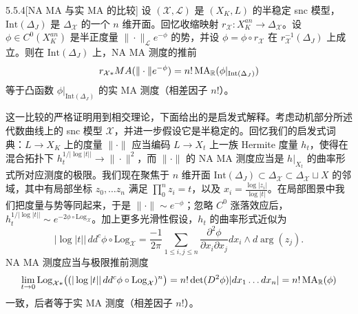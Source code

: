 \begin{proposition}{5.5.4}[NA MA 与实 MA 的比较]
设 $(\mathcal X,\mathcal L)$ 是 $(X_K,L)$ 的半稳定 snc 模型，$\mathrm{Int}(\Delta_J)$ 是 $\Delta_{\mathcal X}$ 的一个 $n$ 维开面。回忆收缩映射 $r_{\mathcal X}:X_K^{an}\to\Delta_{\mathcal X}$。设 $\phi\in C^0(X_K^{an})$ 是半正度量 $\|\cdot\|_{\mathcal L}e^{-\phi}$ 的势，并设 $\phi=\phi\circ r_{\mathcal X}$ 在 $r_{\mathcal X}^{-1}(\Delta_J)$ 上成立。则在 $\mathrm{Int}(\Delta_J)$ 上，NA MA 测度的推前
\[
r_{\mathcal X*}MA(\|\cdot\|e^{-\phi})=n!\,\mathrm{MA}_{\mathbb{R}}(\phi|_{\mathrm{Int}(\Delta_J)})
\]
等于凸函数 $\phi|_{\mathrm{Int}(\Delta_J)}$ 的实 MA 测度（相差因子 $n!$）。
\end{proposition}


这一比较的严格证明用到相交理论，下面给出的是启发式解释。考虑动机部分所述代数曲线上的 snc 模型 $\mathcal X$，并进一步假设它是半稳定的。回忆我们的启发式词典：$L\to X_K$ 上的度量 $\|\cdot\|$ 应当编码 $L\to X_t$ 上一族 Hermite 度量 $h_t$，使得在混合拓扑下 $h_t^{1/|\log|t||}\to\|\cdot\|^2$，而 $\|\cdot\|$ 的 NA MA 测度应当是 $h|_{X_t}$ 的曲率形式所对应测度的极限。我们现在聚焦于 $n$ 维开面 $\mathrm{Int}(\Delta_J)\subset\Delta_{\mathcal X}\subset\Delta_{\mathcal X}\sqcup X$ 的邻域，其中有局部坐标 $z_0,\dots z_n$ 满足 $\prod_0^n z_i=t$，以及 $x_i=\frac{\log|z_i|}{\log|t|}$。在局部图景中我们把度量与势等同起来，于是 $\|\cdot\|\sim e^{-\phi}$；忽略 $C^0$ 涨落效应后，$h_t^{1/|\log|t||}\sim e^{-2\phi\circ\mathrm{Log}_{\mathcal X}}$。加上更多光滑性假设，$h_t$ 的曲率形式近似为
\[
|\log|t||\,dd^c\phi\circ\mathrm{Log}_{\mathcal X}=\frac{-1}{2\pi}\sum_{1\le i,j\le n}\frac{\partial^2\phi}{\partial x_i\partial x_j}dx_i\wedge d\arg(z_j).
\]
NA MA 测度应当与极限推前测度
\[
\lim_{t\to 0}\mathrm{Log}_{\mathcal X*}\big((|\log|t||\,dd^c\phi\circ\mathrm{Log}_{\mathcal X})^n\big)=n!\det(D^2\phi)|dx_1\dots dx_n|=n!\,\mathrm{MA}_{\mathbb{R}}(\phi)
\]
一致，后者等于实 MA 测度（相差因子 $n!$）。



